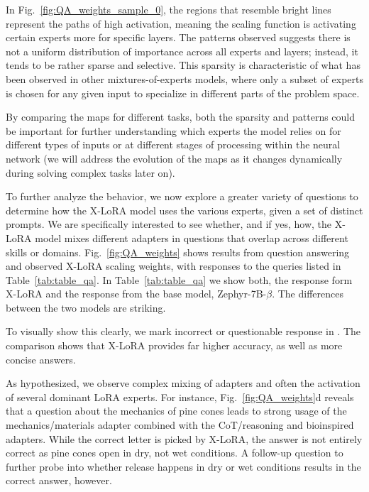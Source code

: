 In Fig.~\ref{fig:QA_weights_sample_0}, the regions that resemble bright lines represent the paths of high activation, meaning the scaling function is activating certain experts more for specific layers. The patterns observed suggests there is not a uniform distribution of importance across all experts and layers; instead, it tends to be rather sparse and selective. This sparsity is characteristic of what has been observed in other mixtures-of-experts models, where only a subset of experts is chosen for any given input to specialize in different parts of the problem space.

By comparing the maps for different tasks, both the sparsity and patterns could be important for further understanding which experts the model relies on for different types of inputs or at different stages of processing within the neural network (we will address the evolution of the maps as it changes dynamically during solving complex tasks later on). 




To further analyze the behavior, we now explore a greater variety of questions to determine how the X-LoRA model uses the various experts, given a set of distinct prompts. We are specifically interested to see whether, and if yes, how, the X-LoRA model mixes different adapters in questions that overlap across different skills or domains.  Fig.~\ref{fig:QA_weights} shows results from question answering and observed X-LoRA scaling weights, with responses to the queries listed in Table~\ref{tab:table_qa}.  In  Table~\ref{tab:table_qa} we show both, the response form X-LoRA and the response from the base model, Zephyr-7B-$\beta$. The differences between the two models are striking.

To visually show this clearly, we mark incorrect or questionable response in . The comparison shows that X-LoRA provides far higher accuracy, as well as more concise answers. 

As hypothesized, we observe complex mixing of adapters and often the activation of several dominant LoRA experts. For instance, Fig.~\ref{fig:QA_weights}d reveals that a question about the mechanics of pine cones leads to strong usage of the mechanics/materials adapter combined with the CoT/reasoning and bioinspired adapters. While the correct letter is picked by X-LoRA, the answer is not entirely correct as pine cones open in dry, not wet conditions. A follow-up question to further probe into whether release happens in dry or wet conditions results in the correct answer, however. 

